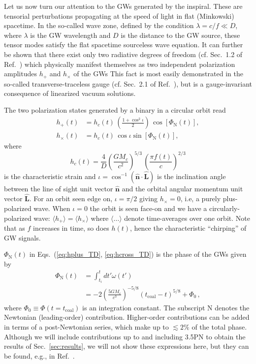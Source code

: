 \documentclass[prd,amsmath,amssymb,aps,floats,amsfonts,notitlepage,superscriptaddress,eqsecnum,nofootinbib,10pt]{revtex4-1}
\newcommand{\nn}{\nonumber}
\newcommand{\f}{\frac}
\newcommand{\be}{\begin{equation}}
\newcommand{\ee}{\end{equation}}
\begin{document}
Let us now turn our attention to the GWs generated by the inspiral.
These are tensorial perturbations propagating at the speed of light in flat (Minkowski) spacetime.
In the so-called wave zone, defined by the condition $ \lambda= c/f \ll D$, where $\lambda$ is the GW wavelength and $D$ is the distance to the GW source, 
these tensor modes satisfy the flat spacetime sourceless wave equation. %
%
It can further be shown that there exist only two radiative degrees of freedom (cf. Sec.~1.2 of Ref.~\cite{Maggiore}) which physically manifest themselves as two independent polarization amplitudes $h_+$ and $h_\times$ of the GWs 
This fact is most easily demonstrated in the so-called transverse-traceless gauge (cf. Sec.~2.1 of Ref.~\cite{Flanagan:2005yc}),
 but is a gauge-invariant consequence of linearized vacuum solutions. %

The two polarization states generated by a binary in a circular orbit read \cite{Maggiore}
%
\begin{align}
 h_+(t) &= h_c(t)\, \left(\f{1+\cos^2\iota}{2}\right)\, \cos[\Phi_\text{N}(t)],\label{eq:hplus_TD}\\
 h_\times(t) & =h_c(t)\,\cos\iota \sin[\Phi_\text{N}(t)]\label{eq:hcross_TD},
\end{align}
%
%
where
%
\be
h_c(t) =\f{4}{D}\left(\f{G M_c}{c^2}\right)^{5/3}\, \left(\f{\pi f(t)}{c}\right)^{2/3} \label{eq:h_c}
\ee
is the characteristic strain and
$\iota=\cos^{-1}(\mathbf{\hat{n}}\cdot{\mathbf{\hat{L}}}) $ is the inclination angle between the line of sight unit vector $\mathbf{\hat{n}} $ and the orbital angular momentum unit vector $\mathbf{\hat{L}}$. 
For an orbit seen edge on, $\iota = \pi/2$ giving $h_\times=0$, i.e,  a purely plus-polarized wave.
When $\iota=0$ the orbit is seen face-on and we have a circularly-polarized wave: $\langle h_+ \rangle = \langle h_\times\rangle$ where $\langle \ldots \rangle$
denote time-averages over one orbit. Note that as $f$ increases in time, so does $h(t)$, hence the characteristic ``chirping'' of GW signals.

$\Phi_\text{N}(t)$ in Eqs.~(\ref{eq:hplus_TD}, \ref{eq:hcross_TD}) is the phase of the GWs given by
%
\begin{align}
\Phi_\text{N}(t) &=\int_{t_i}^t dt' \omega(t') \nn\\
&= -2\left(\f{5 G M_c}{c^3}\right)^{-5/8} (t_\text{coal}-t)^{5/8}+ \Phi_0 \, ,\label{eq:Phase}
\end{align}
%
where $\Phi_0 \equiv \Phi(t=t_\text{coal})$ is an integration constant. The subscript N denotes the Newtonian (leading-order) contribution. 
Higher-order contributions can be added in terms of a post-Newtonian series, which make up to $\lesssim 2\%$ of the total phase.
Although we will include contributions up to and including 3.5PN to obtain the results of Sec.~\ref{sec:results}, 
we will not show these expressions here, but they can be found, e.g., in Ref.~\cite{Blanchet_LRR}.
\end{document}
